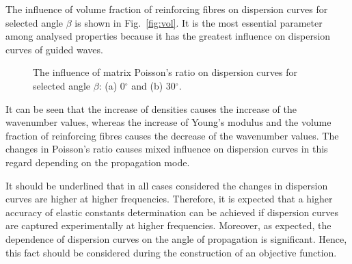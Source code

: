 The influence of volume fraction of reinforcing fibres on dispersion curves for selected 
angle \(\beta\) is shown in Fig.~\ref{fig:vol}. It is the most essential parameter among 
analysed properties because it has the greatest influence on dispersion curves of 
guided waves.


\begin{figure} [h!]
	\centering
	\begin{subfigure}[b]{0.49\textwidth}
		\centering
		

		\caption{}
		\label{fig:nim0}
	\end{subfigure}
	\hfill
	\begin{subfigure}[b]{0.49\textwidth}
		\centering
		
		
		
	
		\caption{}
		\label{fig:nim30}
	\end{subfigure}





















	
\caption{The influence of matrix Poisson's ratio on dispersion curves for selected 
	angle \(\beta\): (a) 0\(^{\circ}\) and (b) 30\(^{\circ}\).}

	\label{fig:nim}
\end{figure}

It can be seen that the increase of densities causes the increase of the wavenumber values, whereas the increase of  Young's modulus and the volume fraction of reinforcing fibres causes the decrease of the wavenumber values. The changes in Poisson's ratio causes mixed influence on dispersion curves in this regard depending on the propagation mode.

It should be underlined that in all cases considered the changes in dispersion curves are higher at higher frequencies. Therefore, it is expected that a higher accuracy of elastic constants determination can be achieved if dispersion curves are captured experimentally at higher frequencies. Moreover, as expected, the dependence of dispersion curves on the angle of propagation is significant. Hence, this fact should be considered during the construction of an objective function.


